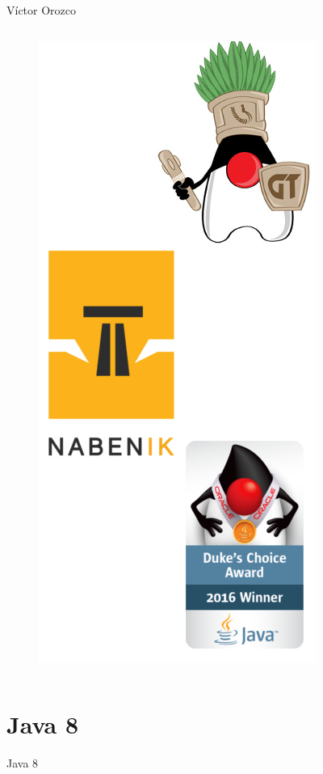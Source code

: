 \documentclass{beamer}
\begin{document}
\begin{frame}{Víctor Orozco}
\begin{columns}[T]
\begin{column}[T]{5cm}
\begin{figure}
                \includegraphics[width=0.7\linewidth]{Images/logos}
            \end{figure}

	     \end{column}
     \end{columns}
\end{frame}

\section{Java 8}
\begin{frame}
\huge Java 8
\end{frame}
\end{document}
